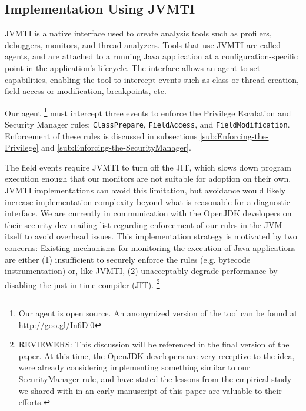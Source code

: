 \documentclass{sig-alternate}
\begin{document}
\subsection{Implementation Using JVMTI}\label{sub:Implementation-Using-JVMTI}

JVMTI is a native interface used to create
analysis tools such as profilers, debuggers, monitors, and thread
analyzers. Tools that use JVMTI are called agents, and are attached
to a running Java application at a configuration-specific point in
the application's lifecycle. The interface allows an agent to set
capabilities, enabling the tool to intercept events such as class
or thread creation, field access or modification, breakpoints, etc.

Our agent \footnote{Our agent is open source. An anonymized version
of the tool can be found at http://goo.gl/In6Di0} must intercept three events to enforce the Privilege Escalation
and Security Manager rules: \texttt{ClassPrepare}, \texttt{FieldAccess},
and \texttt{FieldModification}. Enforcement of these rules is discussed in subsections \ref{sub:Enforcing-the-Privilege} and \ref{sub:Enforcing-the-SecurityManager}.

The field events require JVMTI to turn off the JIT, which slows down program
execution enough that our monitors are not suitable for adoption on their
own. JVMTI implementations can avoid this limitation, but avoidance would likely
increase implementation complexity beyond what is reasonable for a diagnostic
interface. We are currently in communication with the OpenJDK developers on
their security-dev mailing list regarding enforcement of our rules in the JVM
itself to avoid overhead issues.
 This implementation strategy is motivated by
two concerns: Existing mechanisms for monitoring the execution of Java
applications are either (1) insufficient to securely enforce the rules
(e.g. bytecode instrumentation) or, like JVMTI, (2) unacceptably degrade
performance by disabling the just-in-time compiler (JIT). 
\footnote{REVIEWERS: This discussion will be referenced in the final version of the paper. At this time, the OpenJDK developers are very receptive to the idea, were already considering implementing something similar to our SecurityManager rule, and have stated the lessons from the empirical study we shared with in an early manuscript of this paper are valuable to their efforts.}
\end{document}
